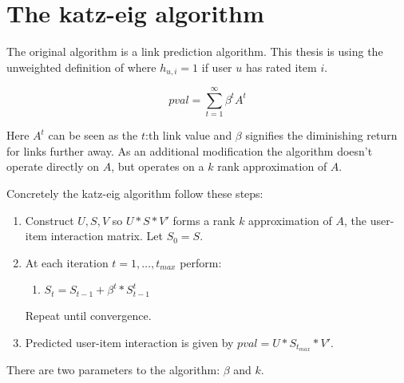 \section{The katz-eig algorithm}\label{sec:katzeig}

The original algorithm \cite{katz1953new} is a link prediction algorithm.
This thesis is using the unweighted definition of \cite{liben2007link} where $h_{u,i} = 1$ if user $u$ has rated item $i$.


\begin{equation}
    \mathit{pval} = \sum_{t=1}^{\infty} \beta^t A^t
\end{equation}

Here $A^t$ can be seen as the $t$:th link value and $\beta$ signifies the diminishing return for links further away.  As an additional modification the algorithm doesn't operate directly on $A$, but operates on a $k$ rank approximation of $A$.


Concretely the katz-eig algorithm follow these steps:

\begin{enumerate}
    \item Construct $U, S, V$ so $U * S * V'$ forms a rank $k$ approximation of $A$, the user-item interaction matrix. Let $S_0 = S$.

    \item At each iteration $t = 1, \ldots, t_{max}$ perform:

        \begin{enumerate}
            \item $S_t = S_{t - 1} + \beta^t * S_{t - 1}^t$
        \end{enumerate}

        Repeat until convergence.

    \item Predicted user-item interaction is given by $\mathit{pval} = U * S_{t_{max}} * V'$.

\end{enumerate}

There are two parameters to the algorithm: $\beta$ and $k$.

